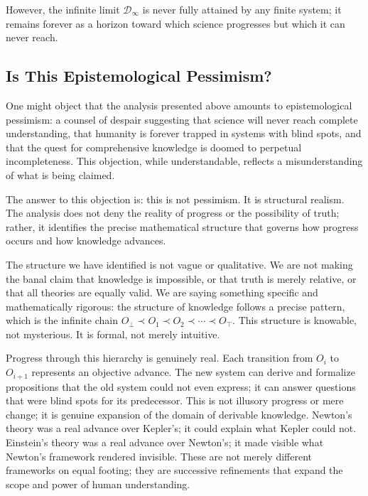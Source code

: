 \documentclass[11pt]{article}
\begin{document}
However, the infinite limit $\mathcal{D}_\infty$ is never fully attained by any finite system; it remains forever as a horizon toward which science progresses but which it can never reach.



\subsection{Is This Epistemological Pessimism?}
\label{subsec:not_pessimism}

One might object that the analysis presented above amounts to epistemological pessimism: a counsel of despair suggesting that science will never reach complete understanding, that humanity is forever trapped in systems with blind spots, and that the quest for comprehensive knowledge is doomed to perpetual incompleteness. This objection, while understandable, reflects a misunderstanding of what is being claimed.

The answer to this objection is: this is not pessimism. It is structural realism. The analysis does not deny the reality of progress or the possibility of truth; rather, it identifies the precise mathematical structure that governs how progress occurs and how knowledge advances.

The structure we have identified is not vague or qualitative. We are not making the banal claim that knowledge is impossible, or that truth is merely relative, or that all theories are equally valid. We are saying something specific and mathematically rigorous: the structure of knowledge follows a precise pattern, which is the infinite chain $O_\perp \prec O_1 \prec O_2 \prec \cdots \prec O_\top$. This structure is knowable, not mysterious. It is formal, not merely intuitive.

Progress through this hierarchy is genuinely real. Each transition from $O_i$ to $O_{i+1}$ represents an objective advance. The new system can derive and formalize propositions that the old system could not even express; it can answer questions that were blind spots for its predecessor. This is not illusory progress or mere change; it is genuine expansion of the domain of derivable knowledge. Newton's theory was a real advance over Kepler's; it could explain what Kepler could not. Einstein's theory was a real advance over Newton's; it made visible what Newton's framework rendered invisible. These are not merely different frameworks on equal footing; they are successive refinements that expand the scope and power of human understanding.
\end{document}
